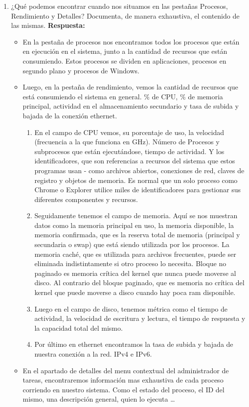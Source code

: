 \documentclass[a4paper,12pt]{article}
\begin{document}
\begin{enumerate}[label=\textbf{Pregunta \arabic*.}]
    \item ¿Qué podemos encontrar cuando nos situamos en las pestañas Procesos, Rendimiento y Detalles? Documenta, de manera exhaustiva, el contenido de las mismas.
    \textbf{Respuesta:}

    \begin{itemize}
        \item En la pestaña de procesos nos encontramos todos los procesos que están en ejecución en el sistema, junto a la cantidad de recursos que están consumiendo. Estos procesos se dividen en aplicaciones, procesos en segundo plano y procesos de Windows.
        \item Luego, en la pestaña de rendimiento, vemos la cantidad de recursos que está consumiendo el sistema en general. \% de CPU, \% de memoria principal, actividad en el almacenamiento secundario y tasa de subida y bajada de la conexión ethernet.
    
        \begin{enumerate}
            \item En el campo de CPU vemos, su porcentaje de uso, la velocidad (frecuencia a la que funciona en GHz). Número de Procesos y subprocesos que están ejecutándose, tiempo de actividad. Y los identificadores, que son referencias a recursos del sistema que estos programas usan - como archivos abiertos, conexiones de red, claves de registro y objetos de memoria. Es normal que un solo proceso como Chrome o Explorer utilice miles de identificadores para gestionar sus diferentes componentes y recursos.
            \item Seguidamente tenemos el campo de memoria. Aquí se nos muestran datos como la memoria principal en uso, la memoria disponible, la memoria confirmada, que es la reserva total de memoria (principal y secundaria o swap) que está siendo utilizada por los procesos. La memoria caché, que es utilizada para archivos frecuentes, puede ser eliminada indistintamente si otro proceso lo necesita. Bloque no paginado es memoria crítica del kernel que nunca puede moverse al disco. Al contrario del bloque paginado, que es memoria no crítica del kernel que puede moverse a disco cuando hay poca ram disponible.
            \item Luego en el campo de disco, tenemos métrica como el tiempo de actividad, la velocidad de escritura y lectura, el tiempo de respuesta y la capacidad total del mismo.
            \item Por último en ethernet encontramos la tasa de subida y bajada de nuestra conexión a la red. IPv4 e IPv6.
        \end{enumerate}
        \item En el apartado de detalles del menu contextual del administrador de tareas, encontraremos información mas exhaustiva de cada proceso corriendo en nuestro sistema. Como el estado del proceso, el ID del mismo, una descripción general, quien lo ejecuta …


\end{itemize}
\end{enumerate}
\end{document}
